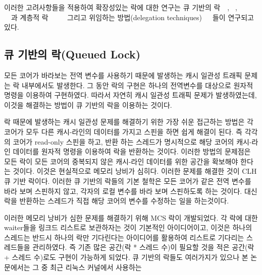 이러한 고려사항들을 적용하여 확장성있는 락에 대한 연구는 큐 기반의
락~\cite{MellorCrummey1991MCS}~\cite{Magnusson1994QLC}, ~\cite{Wang2016BeMyGuest},
~\cite{Scott2013SS}
~\cite{Bueso2014MCS}~\cite{Bueso2015STP}과 계층적
락~\cite{Radovic2003HBL}~\cite{Chabbi2016CLL}~\cite{Luchangco2006HCQ}
~\cite{Chabbi2015HPL} 그리고 위임하는 방법(delegation
techniques)~\cite{Hendler2010FC}~\cite{Fatourou2012RCS}~\cite{Delegation2014}들이
연구되고 있다. 

\subsection{큐 기반의 락(Queued Lock)}
모든 코어가 바라보는 전역 변수를 사용하기 때문에 발생하는 캐시 일관성 트래픽 문제는 
락 내부에서도 발생한다. 
그 동안 락의 구현은 하나의 전역변수를 대상으로 원자적 명령을 이용하여 구현하였다. 
따라서 자연히 캐시 일관성 트래픽 문제가 발생하였는데, 이것을 해결하는 방법이 큐 기반의 락을 
이용하는 것이다. 

락 때문에 발생하는 캐시 일관성 문제를 해결하기 위한 가장 쉬운 접근하는 방법은 각 
코어가 모두 다른 캐시-라인의 데이터를 가지고 스핀을 하면 쉽게 해결이 된다.
즉 각각의 코어가 read-only 스핀을 하고, 반환 하는 스레드가 명시적으로 해당 코어의 캐시-라인 데이터를 
원자적 명령을 이용하여 락을 반환하는 것이다. 
이러한 방법의 문제점은 모든 락이 모든 코어의 중복되지 않은 캐시-라인 데이터를 위한 공간을 확보해야 한다는 것이다.
이것은 현실적으로 메모리 낭비가 심히다.
이러한 문제를 해결한 것이 CLH 큐 기반 락이다. 
이러한 큐 기반의 락들의 기본 철학은 모든 코어가 같은 전역 변수를 바라 보며 스핀하지 않고, 
각자의 로컬 변수를 바라 보며 스핀하도록 하는 것이다. 
대신 락을 반환하는 스레드가 직접 해당 코어의 변수를 수정하는 일을 하는것이다. 

이러한 메모리 낭비가 심한 문제를 해결하기 위해 MCS 락이 개발되었다. 
각 락에 대한 waiter들을 링크드 리스트로 보관하자는 것이 기본적인 아이디어이고, 
이것은 하나의 스레드는 반드시 하나의 락만 기다린다는 아이디어를 활용하여 리스트로 기다리는 
스레드들을 관리하였다. 
즉 기존 많은 공간(락 * 스레드 수)이 필요할 것을 적은 공간(락 + 스레드 수)로도 구현이 가능하게 되었다.
큐 기반의 락들도 여러가지가 있으나 본 논문에서는 그 중 최근 리눅스 커널에서 사용하는 
 
